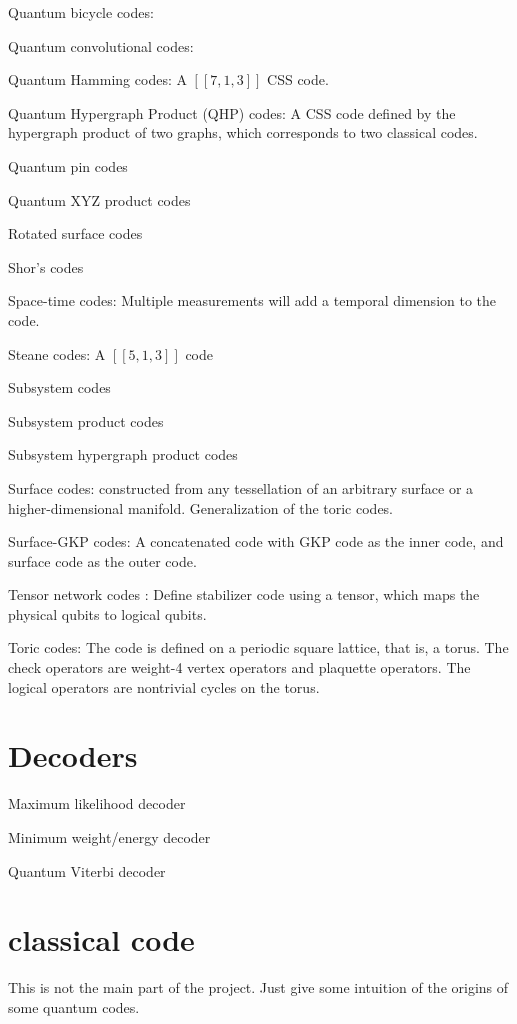 \documentclass[aps,%
pra, twocolumn,%
notitlepage,longbibliography]{revtex4-2}
\begin{document}
Quantum bicycle codes:

Quantum convolutional codes:

Quantum Hamming codes:
A $[[7,1,3]]$ CSS code.


Quantum Hypergraph Product (QHP) codes:
A CSS code defined by the hypergraph product of two graphs, which
corresponds to two classical codes.

Quantum pin codes

Quantum XYZ product codes

Rotated surface codes

Shor's codes

Space-time codes: Multiple measurements will add a temporal dimension
to the code.

Steane codes: A $[[5,1,3]]$ code

Subsystem codes

Subsystem product codes

Subsystem hypergraph product codes

Surface codes: constructed from any tessellation of an arbitrary
surface or a higher-dimensional manifold. Generalization of the toric codes.

Surface-GKP codes: A concatenated code with GKP code as the inner
code, and surface code as the outer code.

Tensor network codes \cite{farrelly2020tensor}: Define stabilizer code
using a tensor, which maps the physical qubits to logical qubits.



Toric codes: The code is defined on a periodic square lattice, that
is, a torus. The check operators are weight-4 vertex operators and
plaquette operators. The logical operators are nontrivial cycles on
the torus.


\section{Decoders}

Maximum likelihood decoder

Minimum weight/energy decoder

Quantum Viterbi decoder


\section{classical code}
This is not the main part of the project. Just give some intuition of
the origins of some quantum codes.
\end{document}
